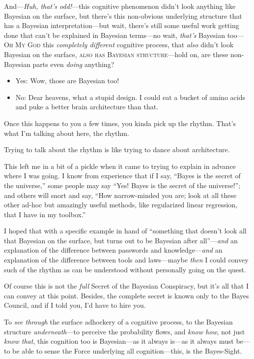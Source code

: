 {
 And---\textit{Huh, that's odd!}{}---this cognitive
phenomenon didn't look anything like Bayesian on the
surface, but there's this non-obvious underlying
structure that has a Bayesian interpretation---but wait,
there's still some useful work getting done that
can't be explained in Bayesian terms---no wait,
\textit{that's} Bayesian too---\textsc{Oh My God} this
\textit{completely different} cognitive process, that \textit{also}
didn't look Bayesian on the surface, \textsc{also has Bayesian
structure}---hold on, are these non-Bayesian parts even \textit{doing}
anything?}

\begin{itemize}
\item Yes: Wow, those are Bayesian too!
\item  No: Dear heavens, what a stupid design. I could eat a bucket of
  amino acids and puke a better brain architecture than that.
\end{itemize}

{
 Once this happens to you a few times, you kinda pick up the
rhythm. That's what I'm talking about
here, the rhythm.}

{
 Trying to talk about the rhythm is like trying to dance about
architecture.}

{
 This left me in a bit of a pickle when it came to trying to
explain in advance where I was going. I know from experience that if I
say, ``Bayes is the secret of the
universe,'' some people may say
``Yes! Bayes is the secret of the
universe!''; and others will snort and say,
``How narrow-minded you are; look at all these other
ad-hoc but amazingly useful methods, like regularized linear
regression, that I have in my toolbox.''}

{
 I hoped that with a specific example in hand of
``something that doesn't look all that
Bayesian on the surface, but turns out to be Bayesian after
all''---\textit{and} an explanation of the difference
between passwords and knowledge---\textit{and} an explanation of the
difference between tools and laws---maybe \textit{then} I could convey
such of the rhythm as can be understood without personally going on the
quest.}

{
 Of course this is not the \textit{full} Secret of the Bayesian
Conspiracy, but it's all that I can convey at this
point. Besides, the complete secret is known only to the Bayes Council,
and if I told you, I'd have to hire you.}

{
 To \textit{see through} the surface adhockery of a cognitive
process, to the Bayesian structure \textit{underneath}{}---to perceive
the probability flows, and \textit{know how}, not just \textit{know
that}, this cognition too is Bayesian---as it always is---as it always
must be---to be able to sense the Force underlying all
cognition---this, is the Bayes-Sight.}

